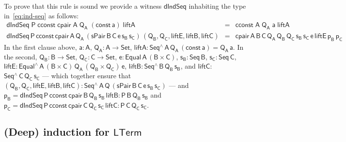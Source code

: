 \documentclass[9pt]{entcs}
\begin{document}
To prove that this rule is sound we provide a witness
$\mathsf{dIndSeq}$ inhabiting the type in~\eqref{eq:ind-seq} as
follows:
\[\begin{array}{lll}
\mathsf{dIndSeq\;P\;cconst\;cpair\;A\;Q_A\;(const\,a)\;liftA}  &
    = &  \mathsf{cconst\;A\;Q_A\;a\;liftA}\\
\mathsf{dIndSeq\,P\,cconst\,cpair\,A\,Q_A\,(sPair\,B\,C\,e\,s_B\,s_C)\,
    (Q_B,Q_C, liftE, liftB, liftC)}  & = &
\mathsf{cpair\,A\,B\,C\,Q_A\,Q_B\,Q_C\,s_B\,s_C\,e\,liftE\,p_B\,p_C}
\end{array}\]
In the first clause above, $\mathsf{a : A}$, $\mathsf{Q_A : A \to
  Set}$, $\mathsf{liftA : Seq^{\wedge}\,A\,Q_A\,(const\,a) =
  Q_A\,a}$. In the second, $\mathsf{Q_B : B \to Set}$, $\mathsf{Q_C :
  C \to Set}$, $\mathsf{e : Equal\,A\,(B \times C)}$, $\mathsf{s_B :
  Seq\,B}$, $\mathsf{s_C : Seq\,C}$, $\mathsf{liftE :
  Equal^{\wedge}\,A\, (B \times C)\, Q_A\, (Q_B \times Q_C) \, e}$,
$\mathsf{liftB : Seq^{\wedge}\,B\,Q_B\,s_B}$, and $\mathsf{liftC :}$
$\mathsf{Seq^{\wedge}\,C\,Q_C\,s_C}$ --- which together ensure that
$\mathsf{(Q_B, Q_C, liftE, liftB, liftC) :
  Seq^{\wedge}\,A\,Q\,(sPair\,B\,C\,e\,s_B\,s_C)}$ --- and
$\mathsf{p_B} =\mathsf{dIndSeq\,P\,cconst\,cpair\,B\,Q_B\,s_B\,liftB :
  P\,B\,Q_B\,s_B}$ and $\mathsf{p_C}
=\mathsf{dIndSeq\,P\,cconst\,cpair\,C\,Q_C\,s_C\,liftC :
  P\,C\,Q_C\,s_C}$.

\subsection{(Deep) induction for $\mathsf{LTerm}$}\label{sec:ind-lam} 
\end{document}
